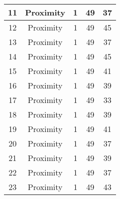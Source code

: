 \documentclass[results.tex]{subfiles}
\begin{document}
\begin{center}
\begin{tabular}{| c || c | c | c | c |}
            \hline
            11                      & Proximity                    & 1                      & 49                      & 37                   \\
            \hline
            12                      & Proximity                    & 1                      & 49                      & 45                   \\
            \hline
            13                      & Proximity                    & 1                      & 49                      & 37                   \\
            \hline
            14                      & Proximity                    & 1                      & 49                      & 45                   \\
            \hline
            15                      & Proximity                    & 1                      & 49                      & 41                   \\
            \hline
            16                      & Proximity                    & 1                      & 49                      & 39                   \\
            \hline
            17                      & Proximity                    & 1                      & 49                      & 33                   \\
            \hline
            18                      & Proximity                    & 1                      & 49                      & 39                   \\
            \hline
            19                      & Proximity                    & 1                      & 49                      & 41                   \\
            \hline
            20                      & Proximity                    & 1                      & 49                      & 37                   \\
            \hline
            21                      & Proximity                    & 1                      & 49                      & 39                   \\
            \hline
            22                      & Proximity                    & 1                      & 49                      & 37                   \\
            \hline
            23                      & Proximity                    & 1                      & 49                      & 43                   \\

\end{tabular}
\end{center}
\end{document}
